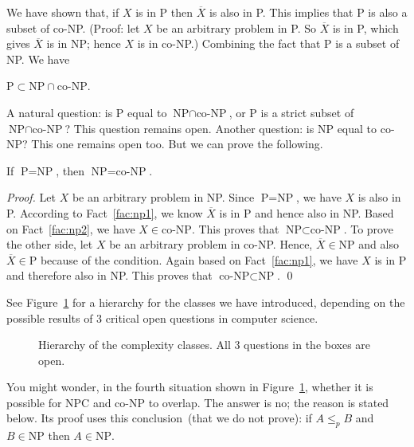 We have shown that, if $X$ is in P then $\overline{X}$ is also in P. 
This implies that P is also a subset of co-NP. (Proof: let $X$ be an arbitrary problem in P.
So $\overline{X}$ is in P, which gives $\overline{X}$ is in NP; hence $X$ is in co-NP.)
Combining the fact that P is a subset of NP. We have

\begin{fact}
$\textrm{P} \subset \textrm{NP} \cap \textrm{co-NP}$.
\end{fact}

A natural question: is P equal to $\textrm{NP} \cap \textrm{co-NP}$, or P is a strict subset of 
$\textrm{NP} \cap \textrm{co-NP}$? This question remains open.
Another question: is NP equal to co-NP? This one remains open too. But we can prove the following.

\begin{fact}
If $\textrm{P} = \textrm{NP}$, then $\textrm{NP} = \textrm{co-NP}$.
\end{fact}

\emph{Proof.} Let $X$ be an arbitrary problem in NP. Since 
$\textrm{P} = \textrm{NP}$, we have $X$ is also in P.
According to Fact~\ref{fac:np1}, we know $\overline{X}$ is in P and hence also in NP.
Based on Fact~\ref{fac:np2}, we have $X\in \textrm{co-NP}$. This proves that $\textrm{NP}\subset \textrm{co-NP}$.
To prove the other side, let $X$ be an arbitrary problem in co-NP.
Hence, $\overline{X} \in \textrm{NP}$ and also $\overline{X} \in \textrm{P}$ because of the condition.
Again based on Fact~\ref{fac:np1}, we have $X$ is in P and therefore also in NP. 
This proves that $\textrm{co-NP}\subset \textrm{NP}$. \qed


See Figure~\ref{fig:hierarchy} for a hierarchy for the classes we have introduced,
depending on the possible results of 3 critical open questions in computer science.

\begin{figure}[!h]
\centering{}
\caption{Hierarchy of the complexity classes. All 3 questions in the boxes are open.}
\label{fig:hierarchy}
\end{figure}

You might wonder, in the fourth situation shown in Figure~\ref{fig:hierarchy},
whether it is possible for NPC and co-NP to overlap. The answer is no; the reason is stated below.
Its proof uses this conclusion~(that we do not prove): if $A \le_p B$ and $B\in\textrm{NP}$ then $A\in\textrm{NP}$. 

